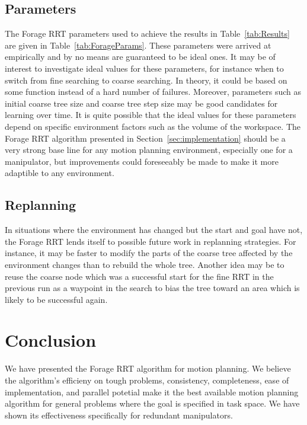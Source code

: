 \documentclass[conference]{IEEEtran}
\begin{document}
\subsection{Parameters}
The Forage RRT parameters used to achieve the results in Table~\ref{tab:Results} are given in Table~\ref{tab:ForageParams}. These parameters
were arrived at empirically and by no means are guaranteed to be ideal ones. It may be of interest to investigate ideal values for these
parameters, for instance when to switch from fine searching to coarse searching. In theory, it could be based on some function instead of a
hard number of failures. Moreover, parameters such as initial coarse tree size and coarse tree step size may be good candidates for learning
over time. It is quite possible that the ideal values for these parameters depend on specific environment factors such as the volume of the
workspace. The Forage RRT algorithm presented in Section~\ref{sec:implementation} should be a very strong base line for any motion planning
environment, especially one for a manipulator, but improvements could foreseeably be made to make it more adaptible to any environment.

\subsection{Replanning}
In situations where the environment has changed but the start and goal have not, the Forage RRT lends itself to possible future work in
replanning strategies. For instance, it may be faster to modify the parts of the coarse tree affected by the environment changes than to
rebuild the whole tree. Another idea may be to reuse the coarse node which was a successful start for the fine RRT in the previous run as a
waypoint in the search to bias the tree toward an area which is likely to be successful again.

\section{Conclusion}
We have presented the Forage RRT algorithm for motion planning. We believe the algorithm's efficieny on tough problems, consistency,
completeness, ease of implementation, and parallel potetial make it the best available motion planning algorithm for general
problems where the goal is specified in task space. We have shown its effectiveness specifically for redundant manipulators.



\end{document}

